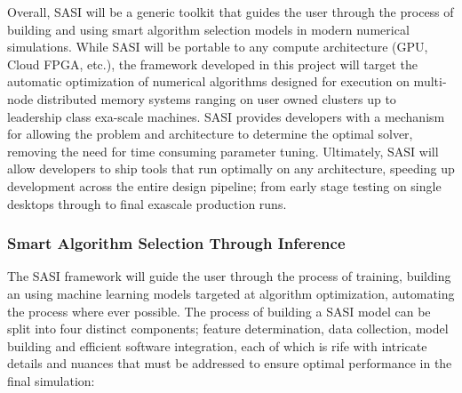 Overall, SASI will be a generic toolkit that guides the user through the process of building and using smart algorithm selection models in modern numerical simulations. While SASI will be portable to any compute architecture (GPU, Cloud FPGA, etc.), the framework developed in this project will target the automatic optimization of numerical algorithms designed for execution on multi-node distributed memory systems ranging on user owned clusters up to leadership class exa-scale machines. SASI provides developers with a mechanism for allowing the problem and architecture to determine the optimal solver, removing the need for time consuming parameter tuning. Ultimately, SASI will allow developers to ship tools that run optimally on any architecture, speeding up development across the entire design pipeline; from early stage testing on single desktops through to final exascale production runs.

\subsubsection{Smart Algorithm Selection Through Inference }

The SASI framework will guide the user through the process of training, building an using machine learning models targeted at algorithm optimization, automating the process where ever possible. The process of building a SASI model can be split into four distinct components; feature determination, data collection, model building and efficient software integration, each of which is rife with intricate details and nuances that must be addressed to ensure optimal performance in the final simulation:

